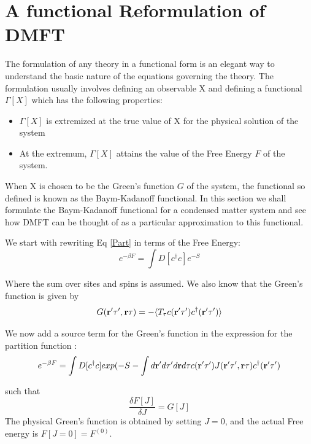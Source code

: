 \documentclass[10pt]{ruthesis}
\begin{document}
\section{A functional Reformulation of DMFT}

The formulation of any theory in a functional form is an elegant way to understand the basic nature of the equations governing the theory. The formulation usually involves defining an observable X and defining a functional $\Gamma[X]$ which has the following properties:
\begin{itemize}
\item $\Gamma[X]$ is extremized at the true value of X for the physical solution of the system
\item At the extremum, $\Gamma[X]$ attains the value of the Free Energy $F$ of the system.
\end{itemize}
 When X is chosen to be the Green's function $G$ of the system, the functional so defined is known as the Baym-Kadanoff functional. In this section we shall formulate the Baym-Kadanoff functional for a condensed matter system and see how DMFT can be thought of as a particular approximation to this functional.
 
We start with rewriting Eq \ref{Part} in terms of the Free Energy:
\begin{equation}
 e^{-\beta F}=\int  D [c^\dagger c] e^{-S}
\end{equation}

Where the sum over sites and spins is assumed. We also know that the Green's function is given by 
\begin{equation}
G(\mathbf{r}' \tau', \mathbf{r} \tau) = -\langle T_{\tau} c(\mathbf{r}' \tau') c ^\dagger (\mathbf{r}' \tau') \rangle 
\end{equation}

We now add a source term for the Green's function in the expression for the partition function :
\begin{equation}
 e^{-\beta F}=\int  D [c^\dagger c] exp(-S -\int d\mathbf{r}' d\tau' d\mathbf{r} d\tau c(\mathbf{r}' \tau') J(\mathbf{r}' \tau', \mathbf{r} \tau)c ^\dagger (\mathbf{r}' \tau') 
 \end{equation}

such that 
\begin{equation}
\dfrac{\delta  F[J]}{\delta J}= G[J]
\end{equation}
The physical Green's function is obtained by setting $ J=0$, and the actual Free energy is $F[J=0]=F^{(0)}$. 
\end{document}
